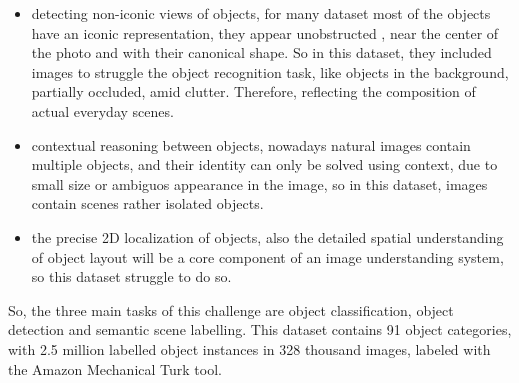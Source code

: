 \documentclass[12pt, a4paper, titlepage,twoside,openright]{article}
\begin{document}
\begin{itemize}

\item detecting non-iconic views of objects, for many dataset most of the objects have an iconic representation, they appear unobstructed , near the center of the photo and with their canonical shape. So in this dataset, they included images to struggle the object recognition task, like objects in the background, partially occluded, amid clutter. Therefore, reflecting the composition of actual everyday scenes.

\item contextual reasoning between objects, nowadays natural images contain multiple objects, and their identity can only be solved using context, due to small size or ambiguos appearance in the image, so in this dataset, images contain scenes rather isolated objects. 

\item the precise 2D localization of objects, also the detailed spatial understanding of object layout will be a core component of an image understanding system, so this dataset struggle to do so.



\end{itemize}


So, the three main tasks of this challenge are object classification, object detection and semantic scene labelling. This dataset contains 91 object categories, with 2.5 million labelled object instances in 328 thousand images, labeled with the Amazon Mechanical Turk tool.
\end{document}
